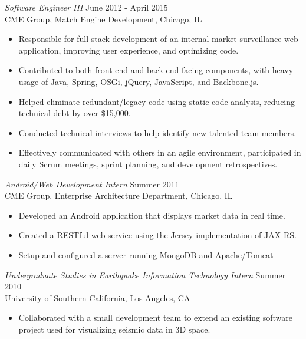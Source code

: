 \documentclass[margin]{res}
\begin{document}
\begin{resume}
                {\sl Software Engineer III} \hfill June 2012 - April 2015 \\
                CME Group, Match Engine Development, Chicago, IL
                 \begin{itemize}  \itemsep -2pt %
                 \item Responsible for full-stack development of an internal market surveillance web application, improving user experience, and optimizing code.
                 \item Contributed to both front end and back end facing components, with heavy usage of Java, Spring, OSGi, jQuery, JavaScript, and Backbone.js.
                 \item Helped eliminate redundant/legacy code using static code analysis, reducing technical debt by over \$15,000.
                 \item Conducted technical interviews to help identify new talented team members.
                 \item Effectively communicated with others in an agile environment, participated in daily Scrum meetings, sprint planning, and development retrospectives.
                \end{itemize}

                {\sl Android/Web Development Intern} \hfill            Summer 2011 \\
                CME Group, Enterprise Architecture Department, Chicago, IL
                 \begin{itemize}  \itemsep -2pt %
                 \item Developed an Android application that displays market data in real time.
                 \item Created a RESTful web service using the Jersey implementation of JAX-RS.
                 \item Setup and configured a server running MongoDB and Apache/Tomcat
                 \end{itemize}

                {\sl Undergraduate Studies in Earthquake Information Technology Intern} \hfill        Summer 2010 \\
                University of Southern California, Los Angeles, CA
                 \begin{itemize} \itemsep -2pt
                  \item Collaborated with a small development team to extend an existing software project used for visualizing seismic data in 3D space.
                  \end{itemize}


\end{resume}
\end{document}

